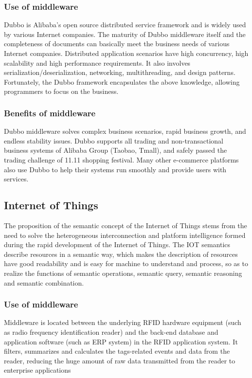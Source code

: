 \documentclass[conference]{IEEEtran}
\begin{document}
\subsubsection{Use of middleware}
Dubbo is Alibaba's open source distributed service framework and is widely used by various Internet companies. The maturity of Dubbo middleware itself and the completeness of documents can basically meet the business needs of various Internet companies. Distributed application scenarios have high concurrency, high scalability and high performance requirements. It also involves serialization/deserialization, networking, multithreading, and design patterns. Fortunately, the Dubbo framework encapsulates the above knowledge, allowing programmers to focus on the business.

\subsubsection{Benefits of middleware}
Dubbo middleware solves complex business scenarios, rapid business growth, and endless stability issues. Dubbo supports all trading and non-transactional business systems of Alibaba Group (Taobao, Tmall), and safely passed the trading challenge of 11.11 shopping festival.
Many other e-commerce platforms also use Dubbo to help their systems run smoothly and provide users with services.

\subsection{Internet of Things}
The proposition of the semantic concept of the Internet of Things stems from the need to solve the heterogeneous interconnection and platform intelligence formed during the rapid development of the Internet of Things. The IOT semantics describe resources in a semantic way, which makes the description of resources have good readability and is easy for machine to understand and process, so as to realize the functions of semantic operations, semantic query, semantic reasoning and semantic combination.

\subsubsection{Use of middleware}
Middleware is located between the underlying RFID hardware equipment (such as radio frequency identification reader) and the back-end database and application software (such as ERP system) in the RFID application system. It filters, summarizes and calculates the tags-related events and data from the reader, reducing the huge amount of raw data transmitted from the reader to enterprise applications
\end{document}
